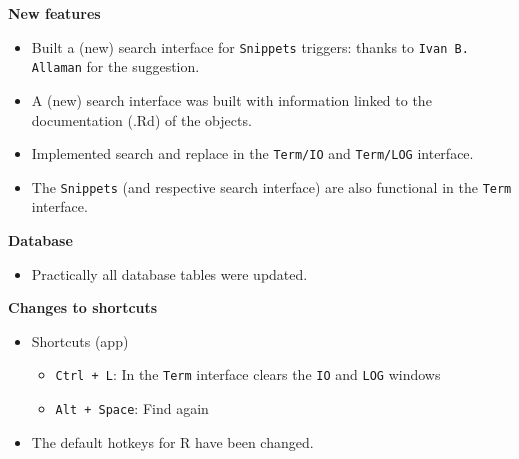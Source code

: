 \textbf{New features}
\begin{itemize}
  \item Built a (new) search interface for \texttt{Snippets} triggers: thanks to \texttt{Ivan B. Allaman}
   for the suggestion.
  \item A (new) search interface was built with information linked to the documentation (.Rd) of the objects.
  \item Implemented search and replace in the \texttt{Term/IO} and \texttt{Term/LOG} interface.
  \item The \texttt{Snippets} (and respective search interface) are also functional in the \texttt{Term} interface.
\end{itemize}
   
\textbf{Database}
\begin{itemize}
  \item Practically all database tables were updated.
\end{itemize}
   
\textbf{Changes to shortcuts}
\begin{itemize}
  \item Shortcuts (app)
  \begin{itemize}
    \item \texttt{Ctrl + L}: In the \texttt{Term} interface clears the \texttt{IO} and \texttt{LOG} windows
    \item \texttt{Alt + Space}: Find again
  \end{itemize}
  \item The default hotkeys for R have been changed.
\end{itemize}
